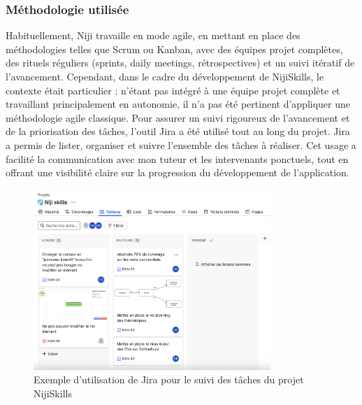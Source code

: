 \documentclass[12pt]{article}
\begin{document}
\subsubsection{Méthodologie utilisée}
Habituellement, Niji travaille en mode agile, en mettant en place des méthodologies telles que Scrum ou Kanban, avec des équipes projet complètes, des rituels réguliers (sprints, daily meetings, rétrospectives) et un suivi itératif de l'avancement. Cependant, dans le cadre du développement de NijiSkills, le contexte était particulier : n'étant pas intégré à une équipe projet complète et travaillant principalement en autonomie, il n'a pas été pertinent d'appliquer une méthodologie agile classique. Pour assurer un suivi rigoureux de l'avancement et de la priorisation des tâches, l'outil Jira a été utilisé tout au long du projet. Jira a permis de lister, organiser et suivre l'ensemble des tâches à réaliser. Cet usage a facilité la communication avec mon tuteur et les intervenants ponctuels, tout en offrant une visibilité claire sur la progression du développement de l'application.
\\
\begin{figure}[H]
  \centering
  \includegraphics[width=0.8\textwidth]{img/jira.png}
  \caption{Exemple d'utilisation de Jira pour le suivi des tâches du projet NijiSkills}
\end{figure}
\end{document}
